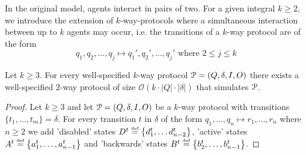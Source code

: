In the original model, agents interact in pairs of two. 
For a given integral $k\geq 2$, we introduce the extension of 
$k$-way-protocols where a simultaneous interaction between up to $k$ agents 
may occur, i.e. the transitions of a $k$-way protocol are of the form
$$q_1, q_2, \ldots, q_j \mapsto q_1', q_2', \ldots, q_j' 
  \text{ where } 2 \leq j \leq k$$
\begin{lemma}
	Let $k \geq 3$.
	For every well-specified $k$-way protocol $\mathcal{P}= (Q, \delta, I, O)$ 
	there exists a well-specified $2$-way protocol of size 
	$\mathcal{O}(k \cdot |Q| \cdot |\delta|)$ that simulates $\mathcal{P}$.
\end{lemma}
\begin{proof}
	Let $k \geq 3$ and let $\mathcal{P} = (Q, \delta, I, O)$ be a $k$-way protocol with 
	transitions $\{t_1, \ldots, t_m\} = \delta$. 
	For every transition $t$ in $\delta$ of the form 
	$q_1, \ldots, q_n \mapsto r_1, \ldots, r_n$ where $n \geq 2$ 
	we add 'disabled' states $D^t \stackrel{\scriptscriptstyle\text{def}}{=} \left\{d^t_{1}, \ldots d^t_{{n-2}}\right\}$, 
	'active' states $A^t \stackrel{\scriptscriptstyle\text{def}}{=} \left\{a^t_{1}, \ldots, a^t_{{n-1}}\right\}$ and 
	'backwards' states $B^t \stackrel{\scriptscriptstyle\text{def}}{=} \left\{b^t_{2}, \ldots, b^t_{n-1}\right\}$.


\end{proof}
